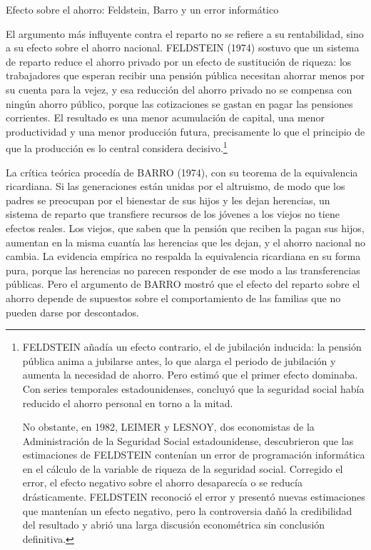 \documentclass[10pt,a4paper]{article}
\begin{document}
Efecto sobre el ahorro: Feldstein, Barro y un error informático

El argumento más influyente contra el reparto no se refiere a su rentabilidad, sino a su efecto sobre el ahorro nacional. FELDSTEIN (1974) sostuvo que un sistema de reparto reduce el ahorro privado por un efecto de sustitución de riqueza: los trabajadores que esperan recibir una pensión pública necesitan ahorrar menos por su cuenta para la vejez, y esa reducción del ahorro privado no se compensa con ningún ahorro público, porque las cotizaciones se gastan en pagar las pensiones corrientes. El resultado es una menor acumulación de capital, una menor productividad y una menor producción futura, precisamente lo que el principio de que la producción es lo central considera decisivo.\footnote{%
    FELDSTEIN añadía un efecto contrario, el de jubilación inducida: la pensión pública anima a jubilarse antes, lo que alarga el periodo de jubilación y aumenta la necesidad de ahorro. Pero estimó que el primer efecto dominaba. Con series temporales estadounidenses, concluyó que la seguridad social había reducido el ahorro personal en torno a la mitad.

No obstante, en 1982, LEIMER y LESNOY, dos economistas de la Administración de la Seguridad Social estadounidense, descubrieron que las estimaciones de FELDSTEIN contenían un error de programación informática en el cálculo de la variable de riqueza de la seguridad social. Corregido el error, el efecto negativo sobre el ahorro desaparecía o se reducía drásticamente. FELDSTEIN reconoció el error y presentó nuevas estimaciones que mantenían un efecto negativo, pero la controversia dañó la credibilidad del resultado y abrió una larga discusión econométrica sin conclusión definitiva.
}

La crítica teórica procedía de BARRO (1974), con su teorema de la equivalencia ricardiana. Si las generaciones están unidas por el altruismo, de modo que los padres se preocupan por el bienestar de sus hijos y les dejan herencias, un sistema de reparto que transfiere recursos de los jóvenes a los viejos no tiene efectos reales. Los viejos, que saben que la pensión que reciben la pagan sus hijos, aumentan en la misma cuantía las herencias que les dejan, y el ahorro nacional no cambia. La evidencia empírica no respalda la equivalencia ricardiana en su forma pura, porque las herencias no parecen responder de ese modo a las transferencias públicas. Pero el argumento de BARRO mostró que el efecto del reparto sobre el ahorro depende de supuestos sobre el comportamiento de las familias que no pueden darse por descontados.
\end{document}
